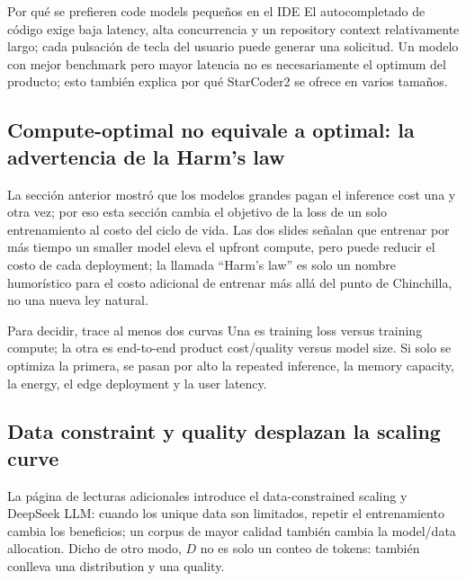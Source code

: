 \begin{knowledgebox}{Por qué se prefieren code models pequeños en el IDE}
El autocompletado de código exige baja latency, alta concurrencia y un repository context relativamente largo; cada pulsación de tecla del usuario puede generar una solicitud. Un modelo con mejor benchmark pero mayor latencia no es necesariamente el optimum del producto; esto también explica por qué StarCoder2 se ofrece en varios tamaños.
\end{knowledgebox}

\subsection{Compute-optimal no equivale a optimal: la advertencia de la Harm's law}

La sección anterior mostró que los modelos grandes pagan el inference cost una y otra vez; por eso esta sección cambia el objetivo de la loss de un solo entrenamiento al costo del ciclo de vida. Las dos slides señalan que entrenar por más tiempo un smaller model eleva el upfront compute, pero puede reducir el costo de cada deployment; la llamada ``Harm's law'' es solo un nombre humorístico para el costo adicional de entrenar más allá del punto de Chinchilla, no una nueva ley natural.



\begin{importantbox}{Para decidir, trace al menos dos curvas}
Una es training loss versus training compute; la otra es end-to-end product cost/quality versus model size. Si solo se optimiza la primera, se pasan por alto la repeated inference, la memory capacity, la energy, el edge deployment y la user latency.
\end{importantbox}

\subsection{Data constraint y quality desplazan la scaling curve}

La página de lecturas adicionales introduce el data-constrained scaling y DeepSeek LLM: cuando los unique data son limitados, repetir el entrenamiento cambia los beneficios; un corpus de mayor calidad también cambia la model/data allocation. Dicho de otro modo, $D$ no es solo un conteo de tokens: también conlleva una distribution y una quality.

